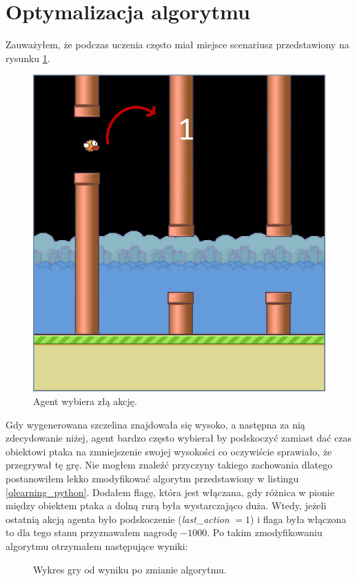 \documentclass[a4paper, 12pt,oneside]{book}
\begin{document}
\section{Optymalizacja algorytmu}
Zauważyłem, że podczas uczenia często miał miejsce scenariusz przedstawiony na
rysunku \ref{agent_top_pipe}.
\begin{figure}[!htb] 
	\begin{center}
		\includegraphics[scale=0.45]{agent_top_pipe_penalty.png}
	\end{center}
	\caption{Agent wybiera złą akcję.}
	\label{agent_top_pipe}
\end{figure}
Gdy wygenerowana szczelina znajdowała się wysoko, a następna za nią
zdecydowanie niżej, agent bardzo często wybierał by podskoczyć zamiast dać czas
obiektowi ptaka na zmniejszenie swojej wysokości co oczywiście sprawiało,
że przegrywał tę grę. Nie mogłem znaleźć przyczyny takiego zachowania dlatego
postanowiłem lekko zmodyfikować algorytm przedstawiony w listingu
\ref{qlearning_python}. Dodałem flagę, która jest włączana, gdy różnica w
pionie między obiektem ptaka a dolną rurą była wystarczająco duża. Wtedy,
jeżeli ostatnią akcją agenta było podskoczenie (\textit{last\_action}
$=1$) i flaga była włączona to dla tego stanu przyznawałem nagrodę $-1000$. Po
takim zmodyfikowaniu algorytmu otrzymałem następujące wyniki:
\begin{figure}[!htb]
	\begin{center}
		
	\end{center}
	\caption{Wykres gry od wyniku po zmianie algorytmu.}
	\label{plot_top_pipe_penalty}
\end{figure}
\end{document}

